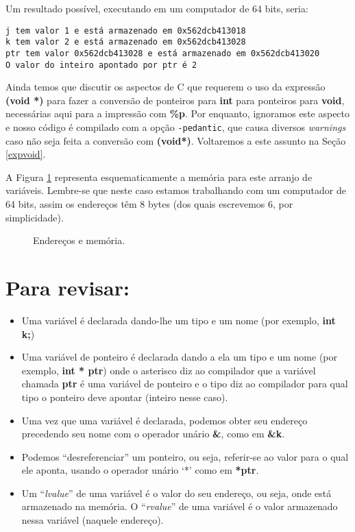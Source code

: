Um resultado possível, executando em um computador de 64 bits, seria:
\lstconsolestyle
\begin{lstlisting}
j tem valor 1 e está armazenado em 0x562dcb413018
k tem valor 2 e está armazenado em 0x562dcb413028
ptr tem valor 0x562dcb413028 e está armazenado em 0x562dcb413020
O valor do inteiro apontado por ptr é 2
\end{lstlisting}
\lstcodestyle
\begin{remark}
	Ainda temos que discutir os aspectos de C que requerem o uso da expressão \textbf{(void *)} para fazer a conversão de ponteiros para \textbf{int} para ponteiros para \textbf{void}, necessárias aqui para a impressão com \textbf{\%p}. Por enquanto, ignoramos este aspecto e nosso código é compilado com a opção \texttt{-pedantic}, que causa diversos \textit{warnings} caso não seja feita a conversão com \textbf{(void*)}. Voltaremos a este assunto na Seção \ref{expvoid}.

\end{remark}

A Figura \ref{enderecos} representa esquematicamente a memória para este arranjo de variáveis. Lembre-se que neste caso estamos trabalhando com um computador de 64 bits, assim os endereços têm 8 bytes (dos quais escrevemos 6, por simplicidade). 

\begin{figure}[ht]
	\begin{center}
		
		\caption{Endereços e memória.}
		\label{fig:esquemamemoria}
	\end{center}
\label{enderecos}
\end{figure}


\section*{Para revisar:}
\begin{itemize}
	\item Uma variável é declarada dando-lhe um tipo e um nome (por exemplo, \textbf{int k;})
	\item Uma variável de ponteiro é declarada dando a ela um tipo e um nome (por exemplo, \textbf{int * ptr}) onde o asterisco diz ao compilador que a variável chamada \textbf{ptr} é uma variável de ponteiro e o tipo diz ao compilador para qual tipo o ponteiro deve apontar (inteiro nesse caso).
	\item Uma vez que uma variável é declarada, podemos obter seu endereço precedendo seu nome com o operador unário \textbf{\&}, como em \textbf{\&k}.
	\item Podemos ``desreferenciar'' um ponteiro, ou seja, referir-se ao valor para o qual ele aponta, usando o operador unário `*' como em \textbf{*ptr}.
	\item Um ``\textit{lvalue}'' de uma variável é o valor do seu endereço, ou seja, onde está armazenado na memória. O ``\textit{rvalue}'' de uma variável é o valor armazenado nessa variável (naquele endereço).
\end{itemize}

